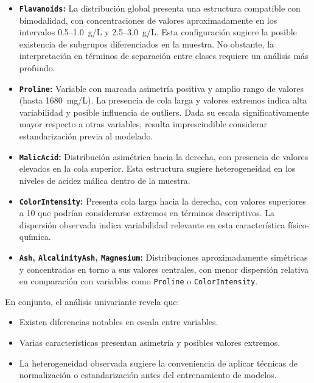 \begin{itemize}

    \item \textbf{\texttt{Flavanoids}:} La distribución global presenta una
    estructura compatible con bimodalidad, con concentraciones de valores
    aproximadamente en los intervalos 0.5--1.0~g/L y 2.5--3.0~g/L.
    Esta configuración sugiere la posible existencia de subgrupos diferenciados
    en la muestra. No obstante, la interpretación en términos de separación entre
    clases requiere un análisis más profundo. 

    \item \textbf{\texttt{Proline}:} Variable con marcada asimetría positiva y
    amplio rango de valores (hasta 1680~mg/L). La presencia de cola larga y
    valores extremos indica alta variabilidad y posible influencia de outliers.
    Dada su escala significativamente mayor respecto a otras variables,
    resulta imprescindible considerar estandarización previa al modelado.

    \item \textbf{\texttt{MalicAcid}:} Distribución asimétrica hacia la derecha,
    con presencia de valores elevados en la cola superior. Esta estructura
    sugiere heterogeneidad en los niveles de acidez málica dentro de la muestra.

    \item \textbf{\texttt{ColorIntensity}:} Presenta cola larga hacia la derecha,
    con valores superiores a 10 que podrían considerarse extremos en términos
    descriptivos. La dispersión observada indica variabilidad relevante en esta
    característica físico-química.

    \item \textbf{\texttt{Ash}, \texttt{AlcalinityAsh}, \texttt{Magnesium}:}
    Distribuciones aproximadamente simétricas y concentradas en torno a sus
    valores centrales, con menor dispersión relativa en comparación con
    variables como \texttt{Proline} o \texttt{ColorIntensity}.

\end{itemize}

En conjunto, el análisis univariante revela que:

\begin{itemize}
    \item Existen diferencias notables en escala entre variables.
    \item Varias características presentan asimetría y posibles valores extremos.
    \item La heterogeneidad observada sugiere la conveniencia de aplicar
    técnicas de normalización o estandarización antes del entrenamiento de modelos.
\end{itemize}

